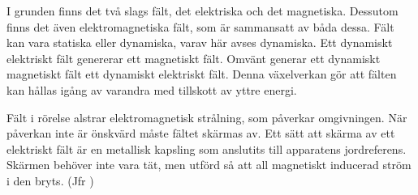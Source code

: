 I grunden finns det två slags fält, det elektriska och det magnetiska.
Dessutom finns det även elektromagnetiska fält, som är sammansatt av båda dessa.
Fält kan vara statiska eller dynamiska, varav här avses dynamiska.
Ett dynamiskt elektriskt fält genererar ett magnetiskt fält.
Omvänt generar ett dynamiskt magnetiskt fält ett dynamiskt elektriskt fält.
Denna växelverkan gör att fälten kan hållas igång av varandra med tillskott av
yttre energi.

Fält i rörelse alstrar elektromagnetisk strålning, som påverkar omgivningen.
När påverkan inte är önskvärd måste fältet skärmas av.
Ett sätt att skärma av ett elektriskt fält är en metallisk kapsling som
anslutits till apparatens jordreferens.
Skärmen behöver inte vara tät, men utförd så att all magnetiskt inducerad ström
i den bryts. (Jfr )
